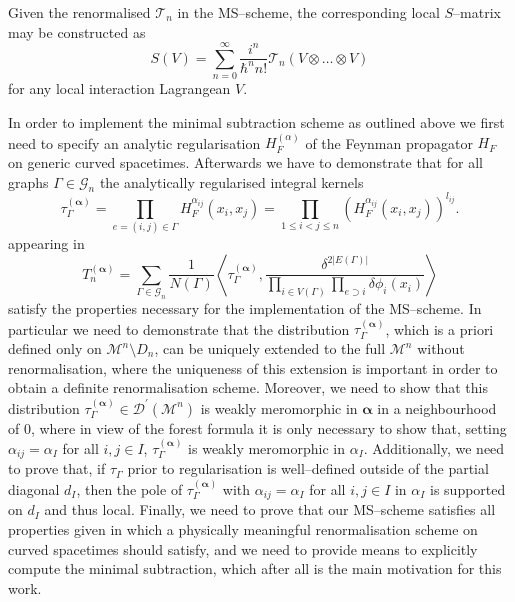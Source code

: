 \documentclass[10pt]{book}
\newcommand{\Dcal}{\mathcal{D}}
\newcommand{\Gcal}{\mathcal{G}}
\newcommand{\Mcal}{\mathcal{M}}
\theoremstyle{break}
\begin{document}
Given the renormalised $\mathcal{T}_n$ in the MS--scheme, the corresponding local $S$--matrix may be constructed as 
\[
S(V) = \sum^\infty_{n=0}\frac{i^n}{\hbar^n n!}\mathcal{T}_n(V\otimes  \dots \otimes V)
\]
for any local interaction Lagrangean $V$.



In order to implement the minimal subtraction scheme as outlined above we first need to specify an analytic regularisation $H^{(\alpha)}_F$ of the Feynman propagator $H_F$ on generic curved spacetimes. Afterwards we have to demonstrate that for all graphs $\Gamma\in\Gcal_n$ the analytically regularised integral kernels 
%
\begin{equation}
\tau^{(\boldsymbol{\alpha})}_\Gamma = \prod_{e=(i,j)\in \Gamma} H^{\alpha_{ij}}_F(x_{i},x_{j})=\prod_{1\le i<j\le n} \left(H^{\alpha_{ij}}_F(x_{i},x_{j})\right)^{l_{ij}}.
\end{equation}
%
appearing in
%
\begin{equation}
T^{(\boldsymbol{\alpha})}_n = \sum_{\Gamma\in \mathcal{G}_n}  \frac{1}{N(\Gamma)}    \left\langle  \tau^{(\boldsymbol{\alpha})}_\Gamma  , \frac{\delta^{2|E(\Gamma)|}}{   \prod_{i \in V(\Gamma)} \prod_{e \supset i}    \delta \phi_i(x_{i}) } \right\rangle 
\end{equation}
%
satisfy the properties necessary for the implementation of the MS--scheme. In particular we need to demonstrate that the distribution $\tau^{(\boldsymbol{\alpha})}_\Gamma$, which is a priori defined only on $\Mcal^n\setminus D_n$, can be uniquely extended to the full $\Mcal^n$ without renormalisation, where the uniqueness of this extension is important in order to obtain a definite renormalisation scheme. Moreover, we need to show that this distribution $\tau^{(\boldsymbol{\alpha})}_\Gamma\in\Dcal^\prime(\Mcal^n)$ is weakly meromorphic in $\boldsymbol{\alpha}$ in a neighbourhood of 0, where in view of the forest formula it is only necessary to show that, setting $\alpha_{ij}=\alpha_I$ for all $i,j\in I$, $\tau^{(\boldsymbol{\alpha})}_\Gamma$ is weakly meromorphic in $\alpha_I$. Additionally, we need to prove that, if $\tau_\Gamma$ prior to regularisation is well--defined outside of the partial diagonal $d_{I}$, then the pole of $\tau^{(\boldsymbol{\alpha})}_\Gamma$ with $\alpha_{ij}=\alpha_I$ for all $i,j\in I$ in $\alpha_I$ is supported on $d_I$ and thus local. Finally, we need 
to prove that our MS--scheme satisfies all properties given in %
which a physically meaningful renormalisation scheme on curved spacetimes should satisfy, and we need to provide means to explicitly compute the minimal subtraction, which after all is the main motivation for this work.
\end{document}
